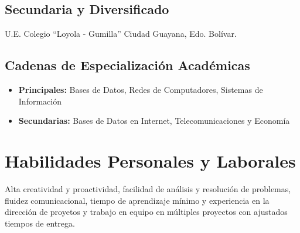 \documentclass[letterpaper,11pt]{report}
\begin{document}
\subsection*{Secundaria y Diversificado}
U.E. Colegio ``Loyola - Gumilla''
Ciudad Guayana, Edo. Bolívar.
\subsection*{Cadenas de Especialización Académicas}
\begin{itemize}
\item
\textbf{Principales:} Bases de Datos, Redes de Computadores, Sistemas de Información
\item
\textbf{Secundarias:} Bases de Datos en Internet, Telecomunicaciones y Economía
\end{itemize}

\section*{Habilidades Personales y Laborales}
Alta creatividad y proactividad, facilidad de análisis y resolución de problemas, fluidez comunicacional, tiempo de aprendizaje mínimo y experiencia en la dirección de proyetos y trabajo en equipo en múltiples proyectos con ajustados tiempos de entrega.
\end{document}

